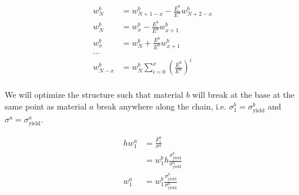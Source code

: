 \begin{align*}
	w_N^b &= w_{N+1-x}^b - \frac{E^b}{E^a} w^b_{N+2-x} \\
	w_N^b &= w_{x}^b - \frac{E^b}{E^a} w^b_{x+1} \\
	w_{x}^b &= w_N^b + \frac{E^b}{E^a} w^b_{x+1} \\
	\dots \\
	w^b_{N-x} &= w^b_N \sum\limits_{i=0}^x \left(\frac{E^b}{E^a}\right)^i \\
\end{align*}

We will optimize the structure such that material $b$ will break at the base at the same point as material $a$ break anywhere along the chain, i.e. $\sigma^b_1 = \sigma^b_\text{yield}$ and $\sigma^a  = \sigma^a_\text{yield}$.

\begin{align*}
	h w_1^a &= \frac{F_1^a}{\sigma^a} \\
	&= w_1^b h \frac{\sigma^b_\text{yield}}{\sigma^a_\text{yield}}\\
	w_1^a &= w_1^b \frac{\sigma^b_\text{yield}}{\sigma^a_\text{yield}}\\
\end{align*}


